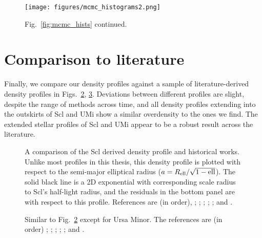 \begin{figure}
\centering
\texttt{[image: figures/mcmc\_histograms2.png]}
\caption[Probabilistic density profiles
continued]{Fig.~\ref{fig:mcmc_hists} continued.}\label{fig:mcmc_hists2}
\end{figure}

\section{Comparison to literature}\label{comparison-to-literature}

Finally, we compare our density profiles against a sample of
literature-derived density profiles in
Figs.~\ref{fig:scl_lit_profiles}, \ref{fig:umi_lit_profiles}. Deviations
between different profiles are slight, despite the range of methods
across time, and all density profiles extending into the outskirts of
Scl and UMi show a similar overdensity to the ones we find. The extended
stellar profiles of Scl and UMi appear to be a robust result across the
literature.

\begin{figure}
\centering
{}
\caption[Sculptor literature density profiles]{A comparison of the Scl
derived density profile and historical works. Unlike most profiles in
this thesis, this density profile is plotted with respect to the
semi-major elliptical radius (\(a = R_{\rm ell} / \sqrt{1-{\rm ell}}\)).
The solid black line is a 2D exponential with corresponding scale radius
to Scl's half-light radius, and the residuals in the bottom panel are
with respect to this profile. References are (in order),
\citet{munoz+2018}; \citet{westfall+2006}; \citet{walcher+2003};
\citet{eskridge1988}; \citet{demers+krautter+kunkel1980}; and
\citet{hodge1961}.}\label{fig:scl_lit_profiles}
\end{figure}

\begin{figure}
\centering
{}
\caption[Ursa Minor literature density profiles]{Similar to
Fig.~\ref{fig:scl_lit_profiles} except for Ursa Minor. The references
are (in order) \citet[derived using their minor axis
profile]{sato+2025}; \citet{palma+2003}; \citet{martinez-delgado+2001};
\citet{kleyna+1998}; \citet{IH1995}; and
\citet{Hodge1964}.}\label{fig:umi_lit_profiles}
\end{figure}

